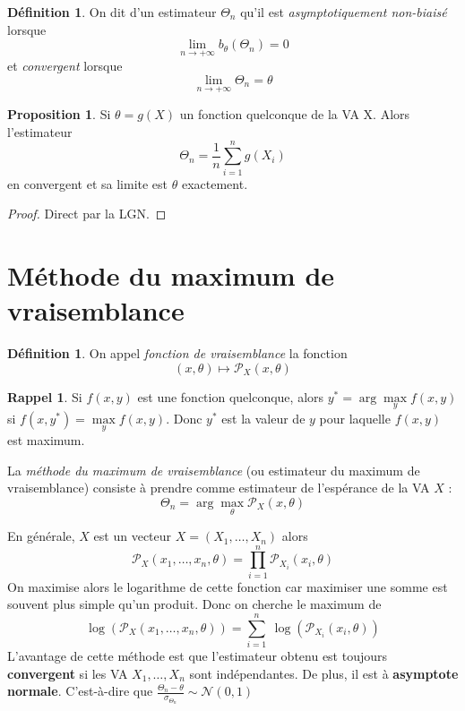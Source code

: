 \documentclass[a4paper,12pt]{report}
\theoremstyle{definition}
\newcommand{\ra}{\rightarrow}
\renewcommand{\(}{\left(}
\renewcommand{\)}{\right)}
\renewcommand{\b}{\textbf}
\renewcommand{\P}{\mathcal{P}}
\renewcommand{\d}{\textit}
\newtheorem{defn}[thm]{Définition}
\newtheorem{prop}[thm]{Proposition}
\newtheorem{rap}[thm]{Rappel}
\begin{document}
        \begin{leftbar}
        \begin{defn}
            On dit d'un estimateur $\Theta_n$ qu'il est \d{asymptotiquement non-biaisé} lorsque
            $$\lim\limits_{n\ra+\infty} b_\theta(\Theta_n) = 0$$
            et \d{convergent} lorsque
            $$\lim\limits_{n\ra+\infty} \Theta_n = \theta$$
        \end{defn}
        \end{leftbar}
        
        \begin{leftbar}
        \begin{prop}
            Si $\theta = g(X)$ un fonction quelconque de la VA X. Alors l'estimateur
            $$\Theta_n = \frac{1}{n}\sum_{i=1}^{n}g(X_i)$$
            en convergent et sa limite est $\theta$ exactement.
        \end{prop}
        \end{leftbar}
        
        \begin{proof}
            Direct par la LGN.
        \end{proof}
        
    \section{Méthode du maximum de vraisemblance}
    
        \begin{leftbar}
        \begin{defn}
            On appel \d{fonction de vraisemblance} la fonction
            $$(x,\theta)\mapsto\P_X(x,\theta)$$
        \end{defn}
        \end{leftbar}
        
        \begin{rap}
            Si $f(x,y)$ est une fonction quelconque, alors
            $y^{*} = \arg\max\limits_{y} f(x,y)$ si $f(x,y^{*}) = \max\limits_{y} f(x,y)$. Donc $y^{*}$ est la valeur de $y$ pour laquelle $f(x,y)$ est maximum.
        \end{rap}
        
        La \d{méthode du maximum de vraisemblance} (ou estimateur du maximum de vraisemblance) consiste à prendre comme estimateur de l'espérance de la VA $X$ :
        $$\Theta_n = \arg\max\limits_{\theta}\P_X(x,\theta)$$
        
        En générale, $X$ est un vecteur $X = (X_1,\dots,X_n)$ alors
        $$\P_X(x_1,\dots,x_n,\theta) = \prod_{i=1}^n \P_{X_i}(x_i,\theta)$$
        On maximise alors le logarithme de cette fonction car maximiser une somme est souvent plus simple qu'un produit. Donc on cherche le maximum de 
        $$\log(\P_X(x_1,\dots,x_n,\theta)) = \sum_{i=1}^n~\log(\P_{X_i}(x_i,\theta))$$
        L'avantage de cette méthode est que l'estimateur obtenu est toujours \b{convergent} si les VA $X_1,\dots,X_n$ sont indépendantes. De plus, il est à \b{asymptote normale}. C'est-à-dire que $\frac{\Theta_n-\theta}{\sigma_{\Theta_n}}\sim\mathcal{N}(0,1)$
        
\end{document}
